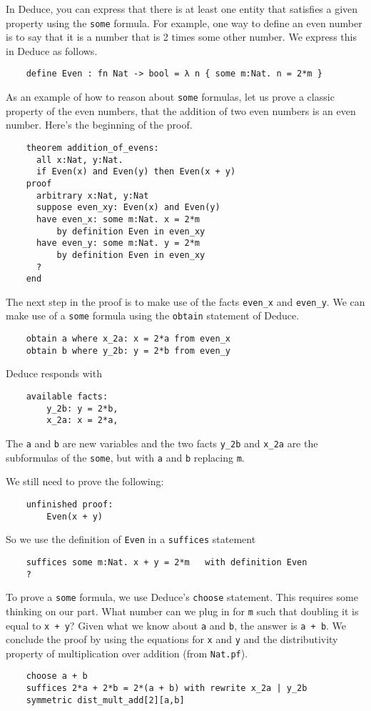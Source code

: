 \documentclass[12pt]{article}
\begin{document}
In Deduce, you can express that there is at least one entity that
satisfies a given property using the \texttt{some} formula.  For example, one
way to define an even number is to say that it is a number that is 2
times some other number. We express this in Deduce as follows.
\begin{verbatim}
    define Even : fn Nat -> bool = λ n { some m:Nat. n = 2*m }
\end{verbatim}
As an example of how to reason about \texttt{some} formulas, let us prove a
classic property of the even numbers, that the addition of two even
numbers is an even number. Here's the beginning of the proof.
\begin{verbatim}
    theorem addition_of_evens:
      all x:Nat, y:Nat.
      if Even(x) and Even(y) then Even(x + y)
    proof
      arbitrary x:Nat, y:Nat
      suppose even_xy: Even(x) and Even(y)
      have even_x: some m:Nat. x = 2*m
          by definition Even in even_xy
      have even_y: some m:Nat. y = 2*m
          by definition Even in even_xy
      ?
    end
\end{verbatim}
The next step in the proof is to make use of the facts
\texttt{even\_x} and \texttt{even\_y}.  We can make use of a
\texttt{some} formula using the \texttt{obtain} statement of Deduce.
\begin{verbatim}
    obtain a where x_2a: x = 2*a from even_x
    obtain b where y_2b: y = 2*b from even_y
\end{verbatim}
Deduce responds with
\begin{verbatim}
    available facts:
        y_2b: y = 2*b,
        x_2a: x = 2*a,
\end{verbatim}
The \texttt{a} and \texttt{b} are new variables and the two facts
\texttt{y\_2b} and \texttt{x\_2a} are the subformulas of the
\texttt{some}, but with \texttt{a} and \texttt{b} replacing
\texttt{m}.

We still need to prove the following:
\begin{verbatim}
    unfinished proof:
        Even(x + y)
\end{verbatim}
So we use the definition of \texttt{Even} in a \texttt{suffices} statement
\begin{verbatim}
    suffices some m:Nat. x + y = 2*m   with definition Even
    ?
\end{verbatim}
To prove a \texttt{some} formula, we use Deduce's \texttt{choose}
statement.  This requires some thinking on our part.  What number can
we plug in for \texttt{m} such that doubling it is equal to \texttt{x
  + y}? Given what we know about \texttt{a} and \texttt{b}, the answer
is \texttt{a + b}. We conclude the proof by using the equations for
\texttt{x} and \texttt{y} and the distributivity property of
multiplication over addition (from \texttt{Nat.pf}).
\begin{verbatim}
    choose a + b
    suffices 2*a + 2*b = 2*(a + b) with rewrite x_2a | y_2b
    symmetric dist_mult_add[2][a,b]
\end{verbatim}
\end{document}
